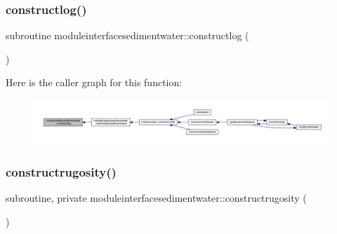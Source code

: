 \subsubsection{\texorpdfstring{constructlog()}{constructlog()}}
{\footnotesize\ttfamily subroutine moduleinterfacesedimentwater\+::constructlog (\begin{DoxyParamCaption}{ }\end{DoxyParamCaption})\hspace{0.3cm}{\ttfamily [private]}}

Here is the caller graph for this function\+:\nopagebreak
\begin{figure}[H]
\begin{center}
\leavevmode
\includegraphics[width=350pt]{namespacemoduleinterfacesedimentwater_a77697f9640e26157a55381bdf7158131_icgraph}
\end{center}
\end{figure}
\mbox{\label{namespacemoduleinterfacesedimentwater_ae92e82b3ef714cf8b3516fa5e25469d3}} 
\subsubsection{\texorpdfstring{constructrugosity()}{constructrugosity()}}
{\footnotesize\ttfamily subroutine, private moduleinterfacesedimentwater\+::constructrugosity (\begin{DoxyParamCaption}{ }\end{DoxyParamCaption})\hspace{0.3cm}{\ttfamily [private]}}

